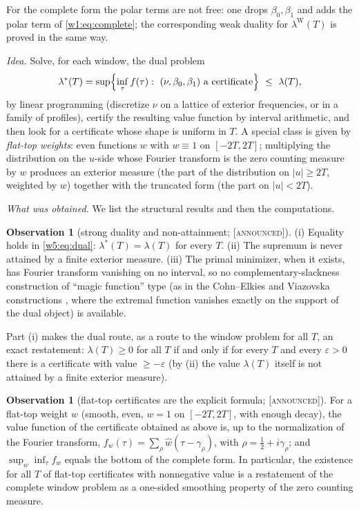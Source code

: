 \documentclass[11pt]{amsart}
\theoremstyle{definition}
\newtheorem{observation}[theorem]{Observation}
\theoremstyle{remark}
\numberwithin{equation}{section}
\newcommand{\lam}{\lambda(T)}                          %
\newcommand{\lamW}{\lambda^{\mathrm W}(T)}             %
\newcommand{\stag}[1]{\textsc{[#1]}}
\newcommand{\ANNOUNCED}{\stag{announced}}
\newcommand{\entry}[1]{\par\smallskip\noindent\textit{#1.}\enspace}
\begin{document}
For the complete form the polar terms are not free: one drops $\beta_0,\beta_1$ and adds the polar term of
\eqref{w1:eq:complete}; the corresponding weak duality for $\lamW$ is proved in the same way.

\entry{Idea} Solve, for each window, the dual problem
\begin{equation}\label{w5:eq:dual}
  \lambda^{\ast}(T)=\sup\Bigl\{\inf_\tau f(\tau):\ (\nu,\beta_0,\beta_1)\ \text{a certificate}\Bigr\}\ \le\ \lam,
\end{equation}
by linear programming (discretize $\nu$ on a lattice of exterior frequencies, or in a family of profiles), certify the
resulting value function by interval arithmetic, and then look for a certificate whose shape is uniform in $T$. A special
class is given by \emph{flat-top weights}: even functions $w$ with $w\equiv1$ on $[-2T,2T]$; multiplying the distribution
on the $u$-side whose Fourier transform is the zero counting measure by $w$ produces an exterior measure (the part of the
distribution on $|u|\ge2T$, weighted by $w$) together with the truncated form (the part on $|u|<2T$).

\entry{What was obtained} We list the structural results and then the computations.

\begin{observation}[strong duality and non-attainment; \ANNOUNCED]\label{w5:obs:strong}
(i) Equality holds in \eqref{w5:eq:dual}: $\lambda^\ast(T)=\lam$ for every $T$. (ii) The supremum is never attained by a
finite exterior measure. (iii) The primal minimizer, when it exists, has Fourier transform vanishing on no interval, so no
complementary-slackness construction of ``magic function'' type (as in the Cohn--Elkies and Viazovska constructions
\cite{CohnElkies2003,Viazovska2017}, where the extremal function vanishes exactly on the support of the dual object) is
available.
\end{observation}

Part (i) makes the dual route, as a route to the window problem for all $T$, an exact restatement: $\lam\ge0$ for all $T$ if and only if for every $T$ and every $\varepsilon>0$ there is a
certificate with value $\ge-\varepsilon$ (by (ii) the value $\lam$ itself is not attained by a finite exterior measure).

\begin{observation}[flat-top certificates are the explicit formula; \ANNOUNCED]\label{w5:obs:flattop}
For a flat-top weight $w$ (smooth, even, $w=1$ on $[-2T,2T]$, with enough decay), the value function of the certificate
obtained as above is, up to the normalization of the Fourier transform, $f_w(\tau)=\sum_\rho\widehat w(\tau-\gamma_\rho)$,
with $\rho=\frac12+i\gamma_\rho$; and $\sup_w\inf_\tau f_w$ equals the bottom of the complete form. In particular, the
existence for all $T$ of flat-top certificates with nonnegative value is a restatement of the complete window problem as
a one-sided smoothing property of the zero counting measure.
\end{observation}
\end{document}
